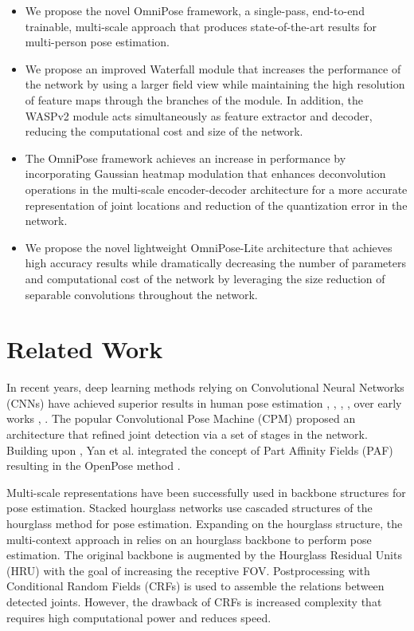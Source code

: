\documentclass[10pt,twocolumn,letterpaper]{article}
\begin{document}
\begin{itemize}
\item We propose the novel OmniPose framework, a single-pass, end-to-end trainable, multi-scale approach that produces state-of-the-art results for multi-person pose estimation.
\vspace{-0.1in}
\item We propose an improved Waterfall module that increases the performance of the network by using a larger field view while maintaining the high resolution of feature maps through the branches of the module. In addition, the WASPv2 module acts simultaneously as feature extractor and decoder, reducing the computational cost and size of the network.
\vspace{-0.1in}
\item The OmniPose framework achieves an increase in performance by incorporating Gaussian heatmap modulation 
that enhances deconvolution operations
in the multi-scale encoder-decoder architecture for a more accurate representation of joint locations and reduction of the quantization error in the network.
\vspace{-0.1in}
\item We propose the novel lightweight OmniPose-Lite architecture that achieves high accuracy results while dramatically decreasing the number of parameters and computational cost of the network by leveraging the size reduction of separable convolutions throughout the network.
\end{itemize}

\section{Related Work}
In recent years,  deep learning methods relying on Convolutional Neural Networks (CNNs) have achieved superior results in human pose estimation \cite{DeepPose}, \cite{CPM}, \cite{OpenPose}, \cite{HRNet}, \cite{LCR-Net} 
over early works \cite{Poselet}, \cite{Articulated}. 
The popular Convolutional Pose Machine (CPM) \cite{CPM} proposed an architecture that refined joint detection via a set of stages in the network.
Building upon \cite{CPM}, Yan et al. integrated the concept of Part Affinity Fields (PAF) resulting in the OpenPose method \cite{OpenPose}. 


Multi-scale representations have been successfully used in backbone structures for pose estimation. Stacked hourglass networks \cite{HourGlass} use cascaded structures of the hourglass method for pose estimation. Expanding on the hourglass structure, the multi-context approach in \cite{Multi-context} relies on an hourglass backbone to perform pose estimation. The original backbone is augmented by
the Hourglass Residual Units (HRU) with the goal of increasing the receptive FOV. Postprocessing with Conditional Random Fields (CRFs) is used to assemble the relations between detected joints. However, the drawback of  CRFs is increased complexity that requires high computational power and reduces speed.
\end{document}
